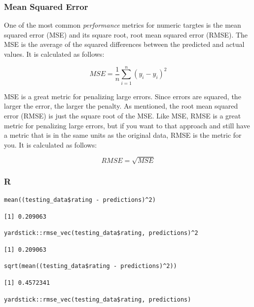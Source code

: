 \documentclass[
  letterpaper,
]{krantz}
\begin{document}
\subsubsection{Mean Squared Error}\label{sec-knowing-metrics-mse}

One of the most common \emph{performance} metrics for numeric targtes is
the mean squared error (MSE) and its square root, root mean squared
error (RMSE). The MSE is the average of the squared differences between
the predicted and actual values. It is calculated as follows:

\[MSE = \frac{1}{n}\sum_{i=1}^{n}(y_i - \hat{y}_i)^2\]

MSE is a great metric for penalizing large errors. Since errors are
squared, the larger the error, the larger the penalty. As mentioned, the
root mean squared error (RMSE) is just the square root of the MSE. Like
MSE, RMSE is a great metric for penalizing large errors, but if you want
to that approach and still have a metric that is in the same units as
the original data, RMSE is the metric for you. It is calculated as
follows:

\[RMSE = \sqrt{MSE}\]

\subsubsection{R}

\begin{verbatim}
mean((testing_data$rating - predictions)^2)
\end{verbatim}

\begin{verbatim}
[1] 0.209063
\end{verbatim}

\begin{verbatim}
yardstick::rmse_vec(testing_data$rating, predictions)^2
\end{verbatim}

\begin{verbatim}
[1] 0.209063
\end{verbatim}

\begin{verbatim}
sqrt(mean((testing_data$rating - predictions)^2))
\end{verbatim}

\begin{verbatim}
[1] 0.4572341
\end{verbatim}

\begin{verbatim}
yardstick::rmse_vec(testing_data$rating, predictions)
\end{verbatim}
\end{document}
